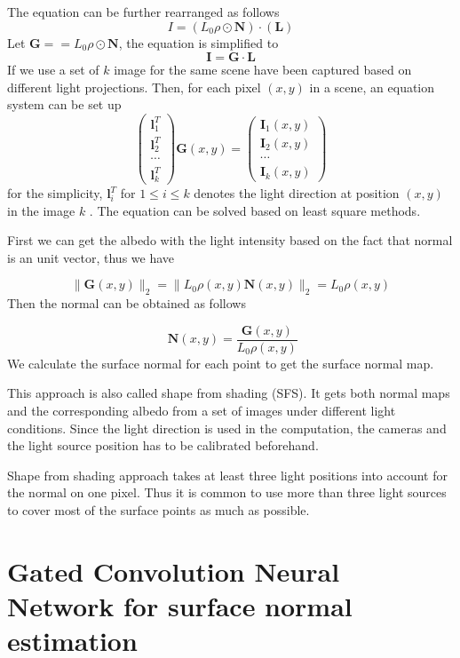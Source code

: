 The equation can be further rearranged as follows
\[ I =(L_0\rho \odot \textbf{N}) \cdot  ( \textbf{L}) \]
Let $ \textbf{G} = =L_0\rho \odot \textbf{N} $, the equation is simplified to 
\[\textbf{I} = \textbf{G} \cdot \textbf{L}\]
If we use a set of $ k $ image for the same scene have been captured based on different light projections. Then, for each pixel $ (x,y) $ in a scene, an equation system can be set up 
\[ 
\begin{pmatrix}
	\textbf{l}_1^T \\
	\textbf{l}_2^T \\
	\cdots \\
	\textbf{l}_k^T
\end{pmatrix} \textbf{G}(x,y) = 
\begin{pmatrix}
	\textbf{I}_1(x,y) \\
	\textbf{I}_2(x,y) \\
	\cdots \\
	\textbf{I}_k(x,y)
\end{pmatrix}
\]
for the simplicity, $ \textbf{l}_i^T $ for $ 1\le i \le k $ denotes the light direction at position $ (x,y) $ in the image $ k $ . The equation can be solved based on least square methods. 

First we can get the albedo with the light intensity based on the fact that normal is an unit vector, thus we have 

\[ \|\textbf{G}(x,y)\|_2 = \|L_0\rho(x,y)\textbf{N}(x,y)\|_2 = L_0\rho(x,y) \]
Then the normal can be obtained as follows

\[ \textbf{ N}(x,y) = \frac{\textbf{G}(x,y)}{L_0\rho(x,y)}\]
We calculate the surface normal for each point  to get the surface normal map. 

This approach is also called shape from shading (SFS)\cite{SFS}. It gets both normal maps and the corresponding albedo from a set of images under different light conditions. Since the light direction is used in the computation, the cameras and the light source position has to be calibrated beforehand. 

Shape from shading approach takes at least three light positions into account for the normal on one pixel. Thus it is common to use more than three light sources to cover most of the surface points as much as possible. 

\newpage 
\section{Gated Convolution Neural Network for surface normal estimation}
\label{sec:gcnn}


